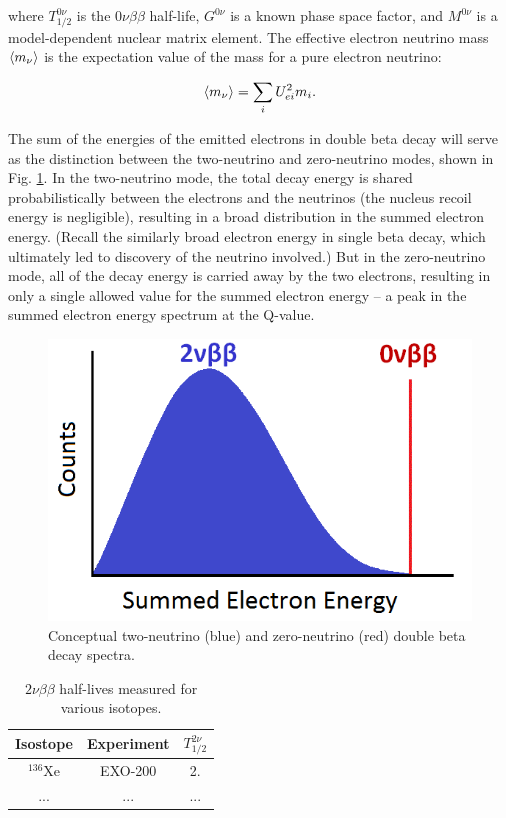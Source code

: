 \noindent
where $T_{1/2}^{0\nu}$ is the $0\nu\beta\beta$ half-life,  $G^{0\nu}$ is a known phase space factor, and $M^{0\nu}$ is a model-dependent nuclear matrix element. The effective electron neutrino mass $\braket{m_{\nu}}$ is the expectation value of the mass for a pure electron neutrino:

\begin{equation}
\braket{m_{\nu}} = \sum\limits_{i} U_{ei}^{2} m_{i}.
\label{eqn:effectivemass}
\end{equation}

The sum of the energies of the emitted electrons in double beta decay will serve as the distinction between the two-neutrino and zero-neutrino modes, shown in Fig. \ref{fig:spectrum_bb}. In the two-neutrino mode, the total decay energy is shared probabilistically between the electrons and the neutrinos (the nucleus recoil energy is negligible), resulting in a broad distribution in the summed electron energy. (Recall the similarly broad electron energy in single beta decay, which ultimately led to discovery of the neutrino involved.) But in the zero-neutrino mode, all of the decay energy is carried away by the two electrons, resulting in only a single allowed value for the summed electron energy -- a peak in the summed electron energy spectrum at the Q-value. 

\begin{figure}[H]
        \centering
                \includegraphics[width=.7\textwidth]{figures/spectrum_bb.png}
                \caption{Conceptual two-neutrino (blue) and zero-neutrino (red) double beta decay spectra.}
\label{fig:spectrum_bb}
\end{figure}

\begin{table}[!htbp]
\caption{$2\nu\beta\beta$ half-lives measured for various isotopes.} %
\label{table:bb_isotopes}
\begin{tabular}{c|c|c}
Isostope & Experiment & $T^{2\nu}_{1/2}$\\
\hline
$^{136}$Xe & EXO-200 & 2.\\
... & ... & ...\\
\end{tabular}
\end{table}

